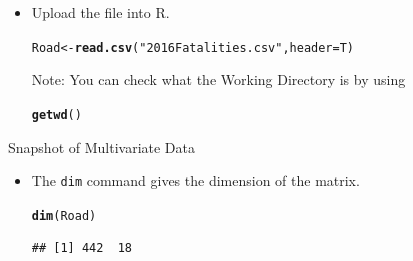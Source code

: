 \documentclass[bigtut]{tutorial}\usepackage[]{graphicx}\usepackage[]{color}
\makeatletter
\newcommand{\hlstr}[1]{\textcolor[rgb]{0.192,0.494,0.8}{#1}}%
\newcommand{\hlstd}[1]{\textcolor[rgb]{0.345,0.345,0.345}{#1}}%
\newcommand{\hlkwb}[1]{\textcolor[rgb]{0.69,0.353,0.396}{#1}}%
\newcommand{\hlkwc}[1]{\textcolor[rgb]{0.333,0.667,0.333}{#1}}%
\newcommand{\hlkwd}[1]{\textcolor[rgb]{0.737,0.353,0.396}{\textbf{#1}}}%
\newenvironment{kframe}{%
 \def\at@end@of@kframe{}%
 \ifinner\ifhmode%
  \def\at@end@of@kframe{\end{minipage}}%
  \begin{minipage}{\columnwidth}%
 \fi\fi%
 \def\FrameCommand##1{\hskip\@totalleftmargin \hskip-\fboxsep
 \colorbox{shadecolor}{##1}\hskip-\fboxsep
     \hskip-\linewidth \hskip-\@totalleftmargin \hskip\columnwidth}%
 \MakeFramed {\advance\hsize-\width
   \@totalleftmargin\z@ \linewidth\hsize
   \@setminipage}}%
 {\par\unskip\endMakeFramed%
 \at@end@of@kframe}
\newenvironment{knitrout}{}{} %
\makeatother
\begin{document}
\begin{tutorial}
\begin{questions}
\begin{itemize}
\item
Upload the file into R.

\begin{knitrout}
\color{fgcolor}\begin{kframe}
\begin{alltt}
\hlstd{Road} \hlkwb{<-} \hlkwd{read.csv}\hlstd{(}\hlstr{"2016Fatalities.csv"}\hlstd{,}\hlkwc{header}\hlstd{=T)}
\end{alltt}
\end{kframe}
\end{knitrout}

\vspace{.5cm}
Note: You can check what the Working Directory is by using 
\begin{knitrout}
\color{fgcolor}\begin{kframe}
\begin{alltt}
\hlkwd{getwd}\hlstd{()}
\end{alltt}
\end{kframe}
\end{knitrout}
\end{itemize}



\question Snapshot of Multivariate Data \\

\begin{itemize}

\item
The \texttt{dim} command gives the dimension of the matrix.
\begin{knitrout}
\color{fgcolor}\begin{kframe}
\begin{alltt}
\hlkwd{dim}\hlstd{(Road)}
\end{alltt}
\begin{verbatim}
## [1] 442  18
\end{verbatim}
\end{kframe}
\end{knitrout}


\end{itemize}
\end{questions}
\end{tutorial}
\end{document}
